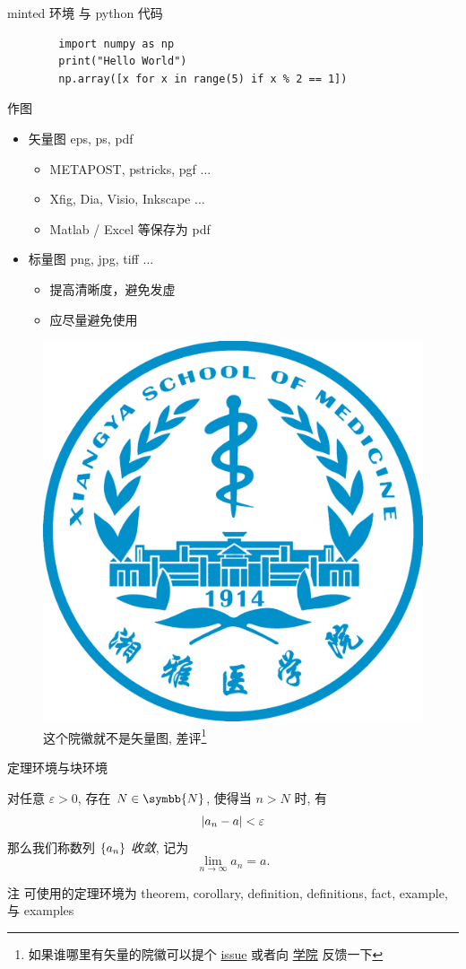 \documentclass{beamer}
\begin{document}
\begin{frame}[fragile]{minted 环境 与 python 代码}
    \begin{verbatim}
        import numpy as np
        print("Hello World")
        np.array([x for x in range(5) if x % 2 == 1])
    \end{verbatim}
\end{frame}

\begin{frame}{作图}
    \begin{itemize}
        \item 矢量图 eps, ps, pdf
        \begin{itemize}
            \item METAPOST, pstricks, pgf $\ldots$
            \item Xfig, Dia, Visio, Inkscape $\ldots$
            \item Matlab / Excel 等保存为 pdf
        \end{itemize}
        \item 标量图 png, jpg, tiff $\ldots$
        \begin{itemize}
            \item 提高清晰度，避免发虚
            \item 应尽量避免使用
        \end{itemize}
    \end{itemize}
    \begin{figure}[htpb]
        \centering
        \includegraphics[width=0.2\linewidth]{pic/xiangya2048.png}
        \caption{这个院徽就不是矢量图, 差评\footnote{ 如果谁哪里有矢量的院徽可以提个 \href{https://github.com/natsumi-kitazato/XiangyaBeamer/issues}{issue} 或者向 \href{https://xysm.csu.edu.cn}{学院} 反馈一下 }}
    \end{figure}
    
\end{frame}

\begin{frame}{定理环境与块环境}
    \begin{definition}[数列极限]
        对任意 $ \varepsilon>0 $, 存在 $ N\in\symbb{N} $, 使得当 $ n>N $ 时, 有
        \[
            \abs{a_{n}-a}<\varepsilon
        \]   
        那么我们称数列 $ \qty{a_{n}} $ \emph{收敛}, 记为
        \[
            \lim_{n\to\infty}a_{n}=a.
        \]
    \end{definition}
    \begin{block}{注}
        可使用的定理环境为 theorem, corollary, definition, definitions, fact, example, 与 examples  
    \end{block}
\end{frame}
\end{document}
